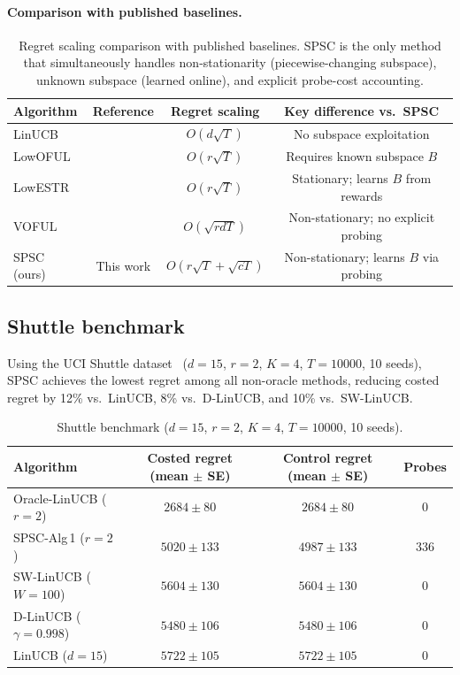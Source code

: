 \documentclass{article}
\begin{document}
\paragraph{Comparison with published baselines.}

\begin{table}[t]
\centering
\small
\begin{tabular}{lccc}
\toprule
Algorithm & Reference & Regret scaling & Key difference vs.\ SPSC \\
\midrule
LinUCB          & \cite{li2010contextual}       & $O(d\sqrt{T})$        & No subspace exploitation \\
LowOFUL         & \cite{jun2019bilinear}        & $O(r\sqrt{T})$        & Requires known subspace $B$ \\
LowESTR         & \cite{lu2021low}              & $O(r\sqrt{T})$        & Stationary; learns $B$ from rewards \\
VOFUL           & \cite{cesabianchi2023colt}     & $O(\sqrt{rdT})$       & Non-stationary; no explicit probing \\
\midrule
SPSC (ours)     & This work                       & $O(r\sqrt{T} + \sqrt{cT})$ & Non-stationary; learns $B$ via probing \\
\bottomrule
\end{tabular}
\caption{Regret scaling comparison with published baselines.
SPSC is the only method that simultaneously handles non-stationarity (piecewise-changing subspace),
unknown subspace (learned online), and explicit probe-cost accounting.}
\label{tab:published_comparison}
\end{table}

\subsection{Shuttle benchmark}

Using the UCI Shuttle dataset~\citep{shuttle1995} ($d=15$, $r=2$, $K=4$, $T=10000$, 10 seeds), SPSC achieves the lowest regret among all non-oracle methods, reducing costed regret by 12\% vs.\ LinUCB, 8\% vs.\ D-LinUCB, and 10\% vs.\ SW-LinUCB.

\begin{table}[t]
\centering
\small
\begin{tabular}{lccc}
\toprule
Algorithm & Costed regret (mean $\pm$ SE) & Control regret (mean $\pm$ SE) & Probes \\
\midrule
Oracle-LinUCB ($r=2$) & $2684 \pm 80$  & $2684 \pm 80$  & 0 \\
SPSC-Alg\,1 ($r=2$)  & $5020 \pm 133$ & $4987 \pm 133$ & 336 \\
SW-LinUCB ($W=100$)   & $5604 \pm 130$ & $5604 \pm 130$ & 0 \\
D-LinUCB ($\gamma=0.998$) & $5480 \pm 106$ & $5480 \pm 106$ & 0 \\
LinUCB ($d=15$)       & $5722 \pm 105$ & $5722 \pm 105$ & 0 \\
\bottomrule
\end{tabular}
\caption{Shuttle benchmark ($d=15$, $r=2$, $K=4$, $T=10000$, 10 seeds).}
\label{tab:shuttle_main}
\end{table}
\end{document}
